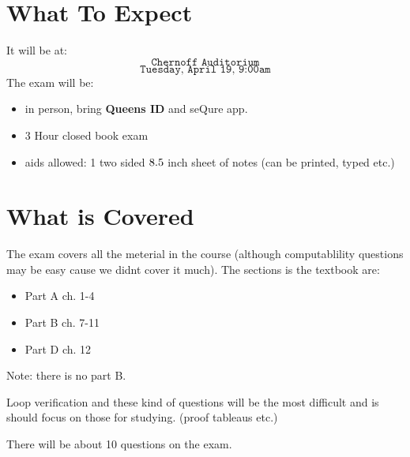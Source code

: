\documentclass[12pt]{book}
\title{\coursetitle\linebreak\lecturename}
\author{\\Cain Susko\\ 
           \\ \\ \\
      Queen's University 
    \\School of Computing\\}
\begin{document}
\begin{titlepage}
        \maketitle
\end{titlepage}


\section*{What To Expect}
It will be at:
\[\texttt{Chernoff Auditorium}\]
\[\texttt{Tuesday, April 19, 9:00am}\]
The exam will be:
\begin{itemize}
        \item in person, bring \textbf{Queens ID} and seQure app.
        \item 3 Hour closed book exam
        \item aids allowed: 1 two sided $8.5 \time 11$ inch sheet of notes (can be printed, typed etc.)
\end{itemize}

\section*{What is Covered}
The exam covers all the meterial in the course (although computablility questions may be easy cause we didnt cover it much).
The sections is the textbook are:
\begin{itemize}
        \item Part A  ch. 1-4
        \item Part B  ch. 7-11
        \item Part D  ch. 12
\end{itemize}
Note: there is no part B.

Loop verification and these kind of questions will be the most difficult and is should focus
on those for studying. (proof tableaus etc.)

There will be about 10 questions on the exam.
\end{document}
